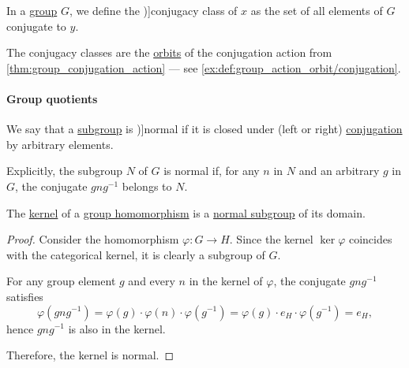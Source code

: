 \begin{definition}\label{def:group_conjugacy_class}
  In a \hyperref[def:group]{group} \( G \), we define the \term[ru=класс сопряжённости, en=conjugacy class (\cite[74]{Jacobson1985BasicAlgebraI})]{conjugacy class} of \( x \) as the set of all elements of \( G \) conjugate to \( y \).
\end{definition}
\begin{comments}
  \item The conjugacy classes are the \hyperref[def:group_action_orbit]{orbits} of the conjugation action from \cref{thm:group_conjugation_action} --- see \cref{ex:def:group_action_orbit/conjugation}.
\end{comments}

\paragraph{Group quotients}

\begin{definition}\label{def:normal_subgroup}
  We say that a \hyperref[def:group/subobject]{subgroup} is \term[ru=нормальная подгруппа (\cite[94]{Тыртышников2017ОсновыАлгебры})]{normal} if it is closed under (left or right) \hyperref[def:group_conjugation]{conjugation} by arbitrary elements.

  Explicitly, the subgroup \( N \) of \( G \) is normal if, for any \( n \) in \( N \) and an arbitrary \( g \) in \( G \), the conjugate \( gng^{-1} \) belongs to \( N \).
\end{definition}

\begin{proposition}\label{thm:kernel_is_normal_subgroup}
  The \hyperref[def:group/kernel]{kernel} of a \hyperref[def:group/morphism]{group homomorphism} is a \hyperref[def:normal_subgroup]{normal subgroup} of its domain.
\end{proposition}
\begin{proof}
  Consider the homomorphism \( \varphi: G \to H \). Since the kernel \( \ker \varphi \) coincides with the categorical kernel, it is clearly a subgroup of \( G \).

  For any group element \( g \) and every \( n \) in the kernel of \( \varphi \), the conjugate \( gng^{-1} \) satisfies
  \begin{equation*}
    \varphi(gng^{-1})
    =
    \varphi(g) \cdot \varphi(n) \cdot \varphi(g^{-1})
    =
    \varphi(g) \cdot e_H \cdot \varphi(g^{-1})
    =
    e_H,
  \end{equation*}
  hence \( gng^{-1} \) is also in the kernel.

  Therefore, the kernel is normal.
\end{proof}

